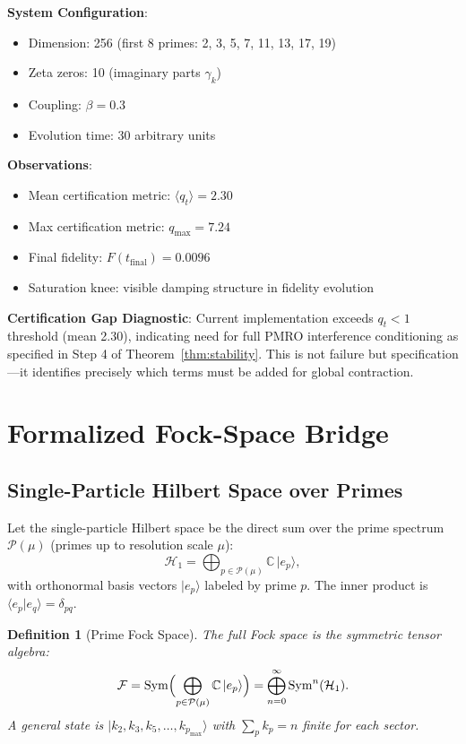 \documentclass[12pt]{amsart}
\theoremstyle{plain}
\newtheorem{definition}[theorem]{Definition}
\begin{document}
\textbf{System Configuration}:
\begin{itemize}[leftmargin=*]
\item Dimension: 256 (first 8 primes: 2, 3, 5, 7, 11, 13, 17, 19)
\item Zeta zeros: 10 (imaginary parts \(\gamma_k\))
\item Coupling: \(\beta = 0.3\)
\item Evolution time: 30 arbitrary units
\end{itemize}

\textbf{Observations}:
\begin{itemize}[leftmargin=*]
\item Mean certification metric: \(\langle q_t \rangle = 2.30\)
\item Max certification metric: \(q_{\max} = 7.24\)
\item Final fidelity: \(F(t_{\text{final}}) = 0.0096\)
\item Saturation knee: visible damping structure in fidelity evolution
\end{itemize}

\textbf{Certification Gap Diagnostic}: Current implementation exceeds \(q_t < 1\) threshold (mean 2.30), indicating need for full PMRO interference conditioning as specified in Step 4 of Theorem~\ref{thm:stability}. This is not failure but specification---it identifies precisely which terms must be added for global contraction.

\section{Formalized Fock-Space Bridge}\label{sec:fock}

\subsection{Single-Particle Hilbert Space over Primes}

Let the single-particle Hilbert space be the direct sum over the prime spectrum \(\mathcal{P}(\mu)\) (primes up to resolution scale \(\mu\)):
\[
\mathcal{H}_1 = \bigoplus_{p \in \mathcal{P}(\mu)} \mathbb{C} \, |e_p\rangle,
\]
with orthonormal basis vectors \(|e_p\rangle\) labeled by prime \(p\). The inner product is \(\langle e_p | e_q \rangle = \delta_{pq}\).

\begin{definition}[Prime Fock Space]
The full Fock space is the symmetric tensor algebra:
\[
\mathcal{F} = \operatorname{Sym}\Bigl( \bigoplus_{p \in \mathcal{P}(\mu)} \mathbb{C} \, |e_p\rangle \Bigr) = \bigoplus_{n=0}^\infty \operatorname{Sym}^n(\mathcal{H}_1).
\]
A general state is \(|k_2, k_3, k_5, \ldots, k_{p_{\max}}\rangle\) with \(\sum_p k_p = n\) finite for each sector.
\end{definition}
\end{document}
